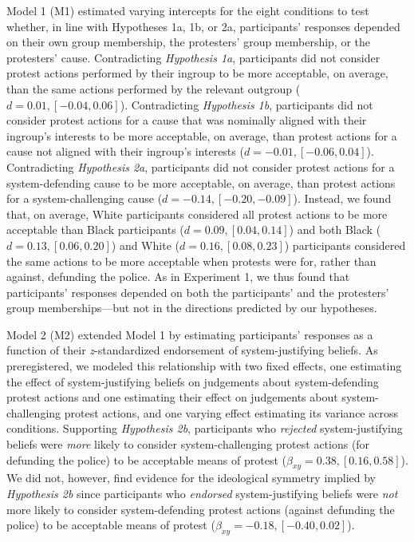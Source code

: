 \documentclass[twocolumn, 11pt, letterpaper]{article}
\begin{document}
Model 1 (M1) estimated varying intercepts for the eight conditions to
test whether, in line with Hypotheses 1a, 1b, or 2a, participants'
responses depended on their own group membership, the protesters' group
membership, or the protesters' cause. Contradicting \emph{Hypothesis
1a}, participants did not consider protest actions performed by their
ingroup to be more acceptable, on average, than the same actions
performed by the relevant outgroup (\(d = 0.01, [-0.04, 0.06]\)).
Contradicting \emph{Hypothesis 1b}, participants did not consider
protest actions for a cause that was nominally aligned with their
ingroup's interests to be more acceptable, on average, than protest
actions for a cause not aligned with their ingroup's interests
(\(d = -0.01, [-0.06, 0.04]\)). Contradicting \emph{Hypothesis 2a},
participants did not consider protest actions for a system-defending
cause to be more acceptable, on average, than protest actions for a
system-challenging cause (\(d = -0.14, [-0.20, -0.09]\)). Instead, we
found that, on average, White participants considered all protest
actions to be more acceptable than Black participants
(\(d = 0.09, [0.04, 0.14]\)) and both Black (\(d = 0.13, [0.06, 0.20]\))
and White (\(d = 0.16, [0.08, 0.23]\)) participants considered the same
actions to be more acceptable when protests were for, rather than
against, defunding the police. As in Experiment 1, we thus found that
participants' responses depended on both the participants' and the
protesters' group memberships---but not in the directions predicted by
our hypotheses.

Model 2 (M2) extended Model 1 by estimating participants' responses as a
function of their \emph{z}-standardized endorsement of system-justifying
beliefs. As preregistered, we modeled this relationship with two fixed
effects, one estimating the effect of system-justifying beliefs on
judgements about system-defending protest actions and one estimating
their effect on judgements about system-challenging protest actions, and
one varying effect estimating its variance across conditions. Supporting
\emph{Hypothesis 2b}, participants who \emph{rejected} system-justifying
beliefs were \emph{more} likely to consider system-challenging protest
actions (for defunding the police) to be acceptable means of protest
(\(\beta_{xy} = 0.38, [0.16, 0.58]\)). We did not, however, find
evidence for the ideological symmetry implied by \emph{Hypothesis 2b}
since participants who \emph{endorsed} system-justifying beliefs were
\emph{not} more likely to consider system-defending protest actions
(against defunding the police) to be acceptable means of protest
(\(\beta_{xy} = -0.18, [-0.40, 0.02]\)).
\end{document}
